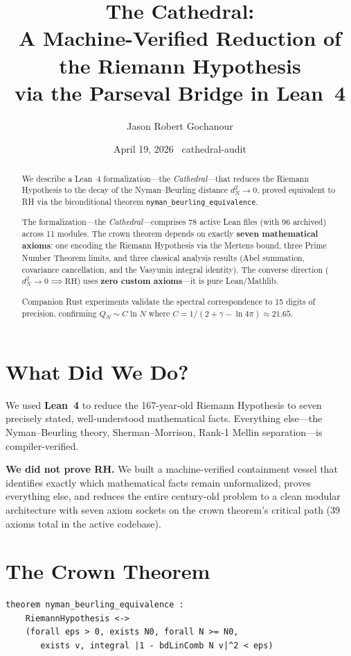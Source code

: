 \documentclass[12pt,a4paper]{article}
\title{%
  The Cathedral:\\[4pt]
  \large A Machine-Verified Reduction of the Riemann Hypothesis\\[2pt]
  \large via the Parseval Bridge in Lean~4%
}
\author{Jason Robert Gochanour}
\date{April 19, 2026 \textemdash\ cathedral-audit}
\begin{document}
\maketitle

\begin{abstract}
We describe a Lean~4 formalization---the \emph{Cathedral}---that reduces
the Riemann Hypothesis to the decay of the Nyman--Beurling distance
$d_N^2 \to 0$, proved equivalent to RH via the biconditional theorem
\texttt{nyman\_beurling\_equivalence}.

The formalization---the \emph{Cathedral}---comprises 78 active Lean files
(with 96 archived) across 11 modules. The crown theorem depends
on exactly \textbf{seven mathematical axioms}: one encoding the Riemann
Hypothesis via the Mertens bound, three Prime Number Theorem limits,
and three classical analysis results (Abel summation, covariance
cancellation, and the Vasyunin integral identity).
The converse direction ($d_N^2 \to 0 \implies \mathrm{RH}$) uses
\textbf{zero custom axioms}---it is pure Lean/Mathlib.

Companion Rust experiments validate the spectral correspondence to
15 digits of precision, confirming $Q_N \sim C \ln N$ where
$C = 1/(2 + \gamma - \ln 4\pi) \approx 21.65$.
\end{abstract}

\section{What Did We Do?}

We used \textbf{Lean~4} to reduce the 167-year-old Riemann Hypothesis
to seven precisely stated, well-understood mathematical facts. Everything
else---the Nyman--Beurling theory, Sherman--Morrison,
Rank-1 Mellin separation---is compiler-verified.

\textbf{We did not prove RH.} We built a machine-verified containment
vessel that identifies exactly which mathematical facts remain unformalized,
proves everything else, and reduces the entire century-old problem to
a clean modular architecture with seven axiom sockets on the crown
theorem's critical path (39 axioms total in the active codebase).

\section{The Crown Theorem}

\begin{verbatim}
theorem nyman_beurling_equivalence :
    RiemannHypothesis <->
    (forall eps > 0, exists N0, forall N >= N0,
       exists v, integral |1 - bdLinComb N v|^2 < eps)
\end{verbatim}
\end{document}

